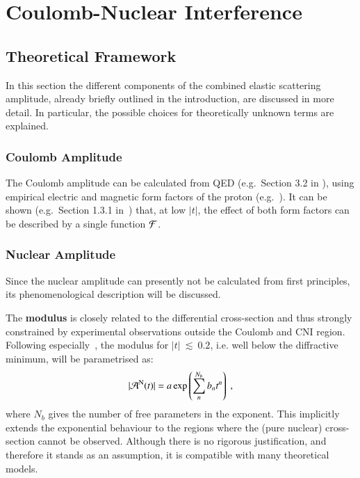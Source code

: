 \section{Coulomb-Nuclear Interference}


\subsection{Theoretical Framework}
\label{sec:cni_framework}
In this section the different components of the combined elastic scattering amplitude, already briefly outlined in the introduction, are discussed in more detail. In particular, the possible choices for theoretically unknown terms are explained.

\subsubsection{Coulomb Amplitude}
%
The Coulomb amplitude can be calculated from QED (e.g.~Section 3.2 in \cite{block06}), using empirical electric and magnetic form factors of the proton (e.g.~\cite{puckett10}). It can be shown (e.g.~Section 1.3.1 in~\cite{jan_thesis}) that, at low $|t|$, the effect of both form factors can be described by a single function ${\cal F}$. 


\subsubsection{Nuclear Amplitude}
%
Since the nuclear amplitude can presently not be calculated from first principles, its phenomenological description will be discussed.

The {\bf modulus} is closely related to the differential cross-section and thus strongly constrained by experimental observations outside the Coulomb and CNI region. Following especially~\cite{8tev-90m}, the modulus for $|t|~\lesssim~0.2$, i.e. well below the diffractive minimum, will be parametrised as:
\begin{equation}
\label{eq:nuc mod}
| {\cal A}^{\rm N}(t) | = a \exp\left( \sum\limits_{n}^{N_b} b_n t^n \right)\ ,
\end{equation}
where $N_b$ gives the number of free parameters in the exponent. This implicitly extends the exponential behaviour to the regions where the (pure nuclear) cross-section cannot be observed. Although there is no rigorous justification, and therefore it stands as an assumption, it is compatible with many theoretical models.

